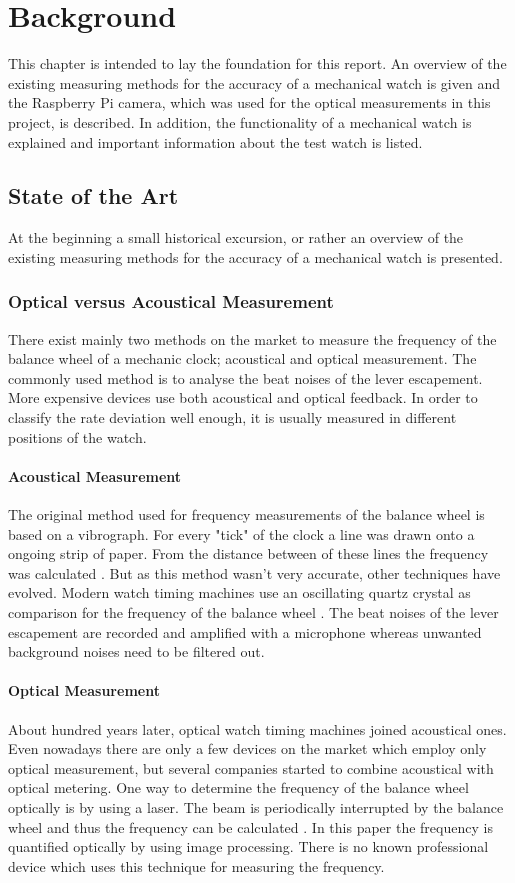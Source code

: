 \documentclass[12pt, a4paper]{report}
\begin{document}
    \chapter{Background}
    This chapter is intended to lay the foundation for this report. An overview of the existing measuring methods for the accuracy of a mechanical watch is given and the Raspberry Pi camera, which was used for the optical measurements in this project, is described. In addition, the functionality of a mechanical watch is explained and important information about the test watch is listed.
    \section{State of the Art}
    At the beginning a small historical excursion, or rather an overview of the existing measuring methods for the accuracy of a mechanical watch is presented.
     \subsection{Optical versus Acoustical Measurement}
    There exist mainly two methods on the market to measure the frequency of the balance wheel of a mechanic clock; acoustical and optical measurement. The commonly used method is to analyse the beat noises of the lever escapement. More expensive devices use both acoustical and optical feedback. In order to classify the rate deviation well enough, it is usually measured in different positions of the watch.
    
    \subsubsection{Acoustical Measurement}
    The original method used for frequency measurements of the balance wheel is based on a vibrograph. For every "tick" of the clock a line was drawn onto a ongoing strip of paper. From the distance between of these lines the frequency was calculated \cite{Zeitwaage}. But as this method wasn't very accurate, other techniques have evolved.  
    Modern watch timing machines use an oscillating quartz crystal as comparison for the frequency of the balance wheel \cite{Zeitwaage}. The beat noises of the lever escapement are recorded and amplified with a microphone whereas unwanted background noises need to be filtered out. 
    
    \subsubsection{Optical Measurement}
    About hundred years later, optical watch timing machines joined acoustical ones. Even nowadays there are only a few devices on the market which employ only optical measurement, but several companies started to combine acoustical with optical metering. One way to determine the frequency of the balance wheel optically is by using a laser. The beam is periodically interrupted by the balance wheel and thus the frequency can be calculated \cite{Lombardi2011}. In this paper the frequency is quantified optically by using image processing. There is no known professional device which uses this technique for measuring the frequency.
    
\end{document}
